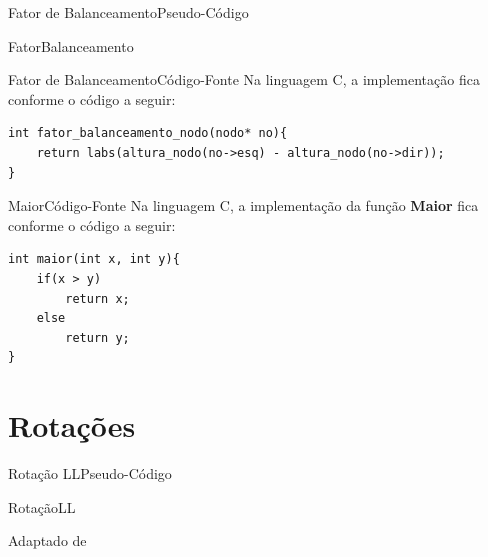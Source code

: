 \documentclass[aspectratio=169]{beamer}
\begin{document}
\begin{frame}{Fator de Balanceamento}{Pseudo-Código}
\begin{algorithm}[H]
\caption{FatorBalanceamento} 
\label{FatorBalanceamento}
\end{algorithm}
\end{frame}


\begin{frame}[fragile]{Fator de Balanceamento}{Código-Fonte}
Na linguagem C, a implementação fica conforme o código a seguir:
\begin{lstlisting}[style=CStyle]
int fator_balanceamento_nodo(nodo* no){
    return labs(altura_nodo(no->esq) - altura_nodo(no->dir));
}
\end{lstlisting}  
\end{frame}



\begin{frame}[fragile]{Maior}{Código-Fonte}
Na linguagem C, a implementação da função {\bf Maior} fica conforme o código a seguir:
\begin{lstlisting}[style=CStyle]
int maior(int x, int y){
    if(x > y)
        return x;
    else
        return y;
}
\end{lstlisting}  
\end{frame}

\section{Rotações}

\begin{frame}{Rotação LL}{Pseudo-Código}
\begin{algorithm}[H]
\caption{RotaçãoLL} 
\label{RotacaoLL}
\end{algorithm}
\tiny{Adaptado de \cite{Backes2016}}  
\end{frame}
\end{document}
